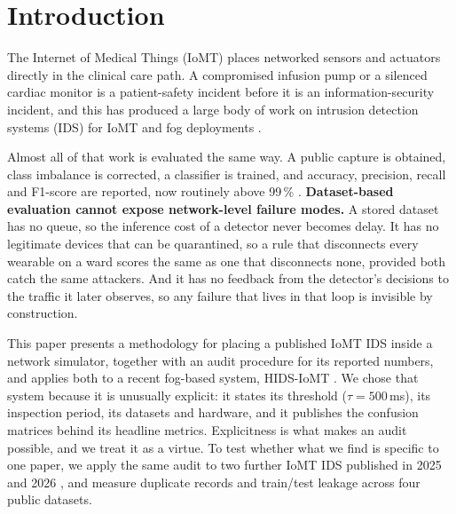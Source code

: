 \section{Introduction}\label{sec:intro}
\noindent The Internet of Medical Things (IoMT) places networked sensors and actuators directly in the clinical care path. A compromised infusion pump or a silenced cardiac monitor is a patient-safety incident before it is an information-security incident, and this has produced a large body of work on intrusion detection systems (IDS) for IoMT and fog deployments \cite{berguiga2025,hosain2025,shaikh2024,ghourabi2025,alalhareth2024,lazrek2024,sogut2026}.

Almost all of that work is evaluated the same way. A public capture is obtained, class imbalance is corrected, a classifier is trained, and accuracy, precision, recall and F1-score are reported, now routinely above 99\,\% \cite{berguiga2025,hosain2025,shaikh2024,sogut2026}. \textbf{Dataset-based evaluation cannot expose network-level failure modes.} A stored dataset has no queue, so the inference cost of a detector never becomes delay. It has no legitimate devices that can be quarantined, so a rule that disconnects every wearable on a ward scores the same as one that disconnects none, provided both catch the same attackers. And it has no feedback from the detector's decisions to the traffic it later observes, so any failure that lives in that loop is invisible by construction.

This paper presents a methodology for placing a published IoMT IDS inside a network simulator, together with an audit procedure for its reported numbers, and applies both to a recent fog-based system, HIDS-IoMT \cite{berguiga2025}. We chose that system because it is unusually explicit: it states its threshold ($\tau = 500$\,ms), its inspection period, its datasets and hardware, and it publishes the confusion matrices behind its headline metrics. Explicitness is what makes an audit possible, and we treat it as a virtue. To test whether what we find is specific to one paper, we apply the same audit to two further IoMT IDS published in 2025 and 2026 \cite{hosain2025,tarish2026}, and measure duplicate records and train/test leakage across four public datasets.


